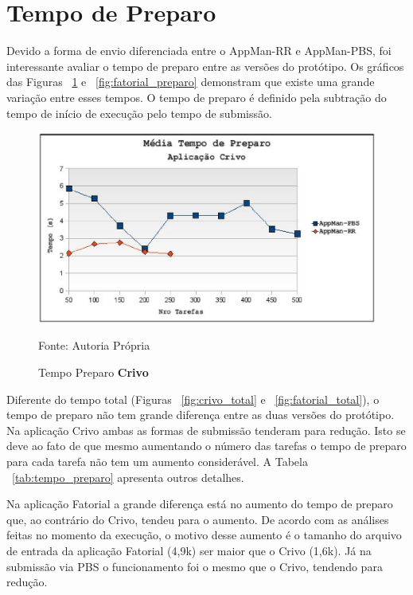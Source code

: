 
\section{Tempo de Preparo}

Devido a forma de envio diferenciada entre o AppMan-RR e AppMan-PBS, foi interessante avaliar o tempo de preparo entre as versões do protótipo. Os gráficos das Figuras ~\ref{fig:crivo_preparo} e ~\ref{fig:fatorial_preparo} demonstram que existe uma grande variação entre esses tempos. O tempo de preparo é definido pela subtração do tempo de início de execução pelo tempo de submissão.

\begin{figure}[hbtp]
\begin{center}
\includegraphics[scale=0.77]{./img/PreparoCrivo.ps}
\caption{Tempo Preparo \textbf{Crivo}}
\label{fig:crivo_preparo}
Fonte: Autoria Própria
\end{center}
\end{figure}


Diferente do tempo total (Figuras ~\ref{fig:crivo_total} e ~\ref{fig:fatorial_total}), o tempo de preparo não tem grande diferença entre as duas versões do protótipo. Na aplicação Crivo ambas as formas de submissão tenderam para redução. Isto se deve ao fato de que mesmo aumentando o número das tarefas o tempo de preparo para cada tarefa não tem um aumento considerável. A Tabela ~\ref{tab:tempo_preparo} apresenta outros detalhes.

Na aplicação Fatorial a grande diferença está no aumento do tempo de preparo que, ao contrário do Crivo, tendeu para o aumento. De acordo com as análises feitas no momento da execução, o motivo desse aumento é o tamanho do arquivo de entrada da aplicação Fatorial (4,9k) ser maior que o Crivo (1,6k). Já na submissão via PBS o funcionamento foi o mesmo que o Crivo, tendendo para redução. 

